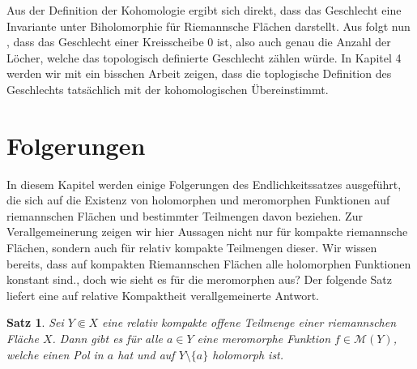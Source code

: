\documentclass[11pt,a4paper]{scrartcl}
\theoremstyle{thm}
\newtheorem{satz}{Satz}[section]
\theoremstyle{def}
\theoremstyle{remark}
\begin{document}
Aus der Definition der Kohomologie ergibt sich direkt, dass das Geschlecht eine Invariante unter Biholomorphie für Riemannsche Flächen darstellt.  Aus  folgt nun , dass das Geschlecht einer Kreisscheibe 0 ist, also auch genau die Anzahl der Löcher, welche das topologisch definierte Geschlecht zählen würde. 
In Kapitel 4 werden wir mit ein bisschen Arbeit zeigen, dass die toplogische Definition des Geschlechts tatsächlich mit der kohomologischen Übereinstimmt. 
\section{Folgerungen}
In diesem Kapitel werden einige Folgerungen des Endlichkeitssatzes ausgeführt, die sich auf die Existenz von holomorphen und meromorphen Funktionen auf riemannschen Flächen und bestimmter Teilmengen davon beziehen.
Zur Verallgemeinerung zeigen wir hier Aussagen nicht nur für kompakte riemannsche Flächen, sondern auch für relativ kompakte Teilmengen dieser.
Wir wissen bereits, dass auf kompakten Riemannschen Flächen alle holomorphen Funktionen konstant sind.\cite[S.10,2.8]{forster}, doch wie sieht es für die meromorphen aus? Der folgende Satz liefert eine auf relative Kompaktheit verallgemeinerte Antwort.
\begin{satz}
Sei $Y\Subset X$ eine relativ kompakte offene Teilmenge einer riemannschen Fläche $X$. Dann gibt es für alle $a\in Y$ eine meromorphe Funktion $f\in \mathcal{M}(Y)$, welche einen Pol in $a$ hat und auf $Y\setminus\{ a \}$ holomorph ist.
\end{satz}
\end{document}
